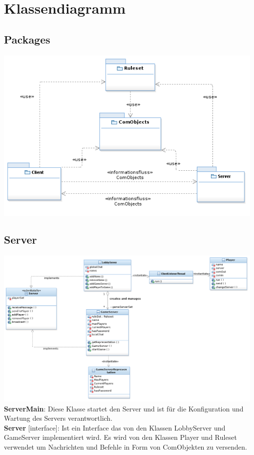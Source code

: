 \documentclass{article}
\begin{document}
\section{Klassendiagramm}

\subsection{Packages}
\includegraphics[width=\textwidth]{Packages}

\subsection{Server}
\includegraphics[width=\textwidth]{Server}
\textbf{ServerMain}: Diese Klasse startet den Server und ist für die Konfiguration und Wartung des Servers verantwortlich. \\

\textbf{Server} [interface]: Ist ein Interface das von den Klassen LobbyServer und GameServer implementiert wird. Es wird von den Klassen Player und Ruleset verwendet um Nachrichten und Befehle in Form von ComObjekten zu versenden. \\
		
\end{document}
